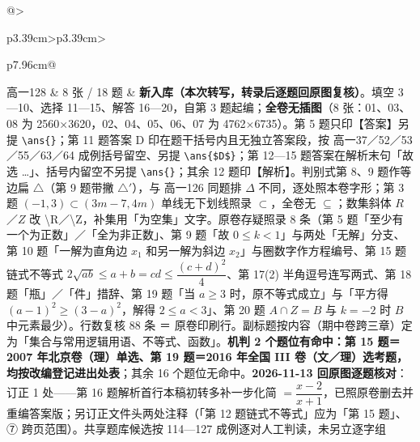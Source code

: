 \documentclass[a4paper,11pt]{article}
\begin{document}
\begin{xltabular}{\textwidth}{@{}>{\raggedright\arraybackslash}p{3.39cm}>{\centering\arraybackslash}p{3.39cm}>{\raggedright\arraybackslash}p{7.96cm}@{}}
高一128 & 8 张 / 18 题 & \textbf{新入库（本次转写，转录后逐题回原图复核）}。填空 3---10、选择 11---15、解答 16---20，自第 3 题起编；\textbf{全卷无插图}（8 张：01、03、08 为 2560$\times$3620，02、04、05、06、07 为 4762$\times$6735）。第 5 题只印【答案】另提 \texttt{\textbackslash{}ans\{\}}；第 11 题答案 D 印在题干括号内且无独立答案段，按 高一37／52／53／55／63／64 成例括号留空、另提 \texttt{\textbackslash{}ans\{\$D\$\}}；第 12---15 题答案在解析末句「故选 \ldots」、括号内留空不另提 \texttt{\textbackslash{}ans\{\}}；其余 12 题印【解析】。判别式第 8、9 题作等边扁 \(\triangle\)（第 9 题带撇 \(\triangle'\)），与 高一126 同题排 \(\Delta\) 不同，逐处照本卷字形；第 3 题 \((-1,\allowbreak 3)\subset\allowbreak (3m-7,\allowbreak 4m)\) 单线无下划线照录 \(\subset\allowbreak \)，全卷无 \(\subseteq\allowbreak \)；数集斜体 \(R\)／\(Z\) 改 \textbackslash R／\textbackslash Z，补集用「为空集」文字。原卷存疑照录 8 条（第 5 题「至少有一个为正数」／「全为非正数」、第 9 题「故 \(0\leq k<1\)」与两处「无解」分支、第 10 题「一解为直角边 \(x_1\) 和另一解为斜边 \(x_2\)」与圈数字作方程编号、第 15 题链式不等式 \(2\sqrt{ab}\leq a+b=cd\leq\dfrac{(c+d)^2}{4}\)、第 17(2) 半角逗号连写两式、第 18 题「瓶」／「件」措辞、第 19 题「当 \(a\geq3\) 时，原不等式成立」与「平方得 \((a-1)^2\geq(3-a)^2\)，解得 \(2\leq a<3\)」、第 20 题 \(A\cap\allowbreak  Z=B\) 与 \(k=\allowbreak -2\) 时 \(B\) 中元素最少）。行数复核 88 条 ＝ 原卷印刷行。副标题按内容（期中卷跨三章）定为「集合与常用逻辑用语、不等式、函数」。\textbf{机判 2 个题位有命中：第 15 题＝2007 年北京卷（理）单选、第 19 题＝2016 年全国 III 卷（文／理）选考题，均按改编登记进出处表}；其余 16 个题位无命中。\textbf{2026-11-13 回原图逐题核对}：订正 1 处------第 16 题解析首行本稿初转多补一步化简 \(=\allowbreak \dfrac{x-2}{x+\allowbreak 1}\)，已照原卷删去并重编答案版；另订正文件头两处注释（「第 12 题链式不等式」应为「第 15 题」、⑦ 跨页范围）。共享题库候选按 114---127 成例逐对人工判读，未另立逐字组 \\ \addlinespace[1pt]

\end{xltabular}
\end{document}
